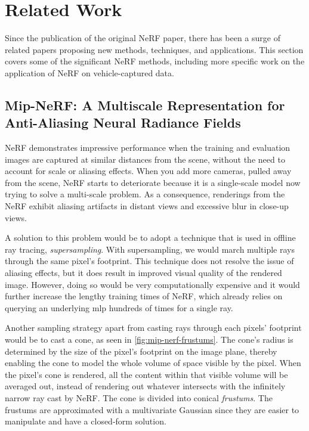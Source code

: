 



\section{Related Work}
Since the publication of the original NeRF paper, there has been a surge of related papers proposing new methods, techniques, and applications. This section covers some of the significant NeRF methods, including more specific work on the application of NeRF on vehicle-captured data.

\subsection[Mip-NeRF]{Mip-NeRF: A Multiscale Representation for Anti-Aliasing Neural Radiance Fields} \label{sec:mipnerf}
NeRF demonstrates impressive performance when the training and evaluation images are captured at similar distances from the scene, without the need to account for scale or aliasing effects. When you add more cameras, pulled away from the scene, NeRF starts to deteriorate because it is a single-scale model now trying to solve a multi-scale problem. As a consequence, renderings from the NeRF exhibit aliasing artifacts in distant views and excessive blur in close-up views.

A solution to this problem would be to adopt a technique that is used in offline ray tracing, \textit{supersampling}. With supersampling, we would march multiple rays through the same pixel's footprint. This technique does not resolve the issue of aliasing effects, but it does result in improved visual quality of the rendered image. However, doing so would be very computationally expensive and it would further increase the lengthy training times of NeRF, which already relies on querying an underlying \acrshort{mlp} hundreds of times for a single ray.

Another sampling strategy apart from casting rays through each pixels' footprint would be to cast a cone, as seen in \autoref{fig:mip-nerf-frustums}. The cone's radius is determined by the size of the pixel's footprint on the image plane, thereby enabling the cone to model the whole volume of space visible by the pixel. When the pixel's cone is rendered, all the content within that visible volume will be averaged out, instead of rendering out whatever intersects with the infinitely narrow ray cast by NeRF. The cone is divided into conical \textit{frustums}. The frustums are approximated with a multivariate Gaussian since they are easier to manipulate and have a closed-form solution.

